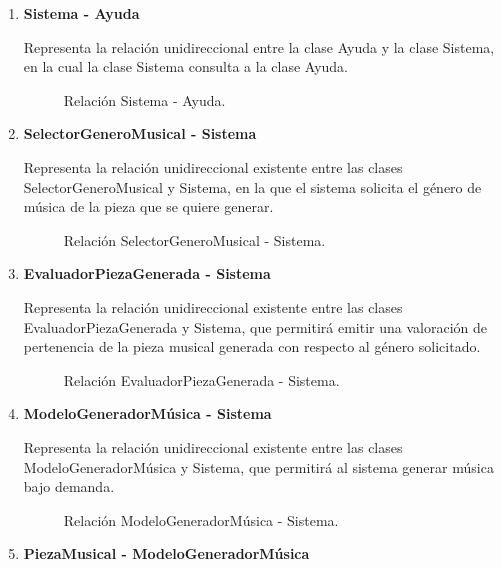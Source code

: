 \begin{enumerate}
  \item \textbf{Sistema - Ayuda}

  Representa la relación unidireccional entre la clase Ayuda y la
  clase Sistema, en la cual la clase Sistema consulta a la clase
  Ayuda.

  \begin{figure}[H]
    \centering
    
    \caption{Relación Sistema - Ayuda.}
  \end{figure}

  \item \textbf{SelectorGeneroMusical - Sistema}

  Representa la relación unidireccional existente entre las clases SelectorGeneroMusical y Sistema, en la que el sistema solicita el género de música de la pieza que se quiere generar.

  \begin{figure}[H]
    \centering
    
    \caption{Relación SelectorGeneroMusical - Sistema.}
  \end{figure}

  \item \textbf{EvaluadorPiezaGenerada - Sistema}

  Representa la relación unidireccional existente entre las clases EvaluadorPiezaGenerada y Sistema, que permitirá emitir una valoración de pertenencia de la pieza musical generada con respecto al género solicitado.

  \begin{figure}[H]
    \centering
    
    \caption{Relación EvaluadorPiezaGenerada - Sistema.}
  \end{figure}

  \item \textbf{ModeloGeneradorMúsica - Sistema}

  Representa la relación unidireccional existente entre las clases ModeloGeneradorMúsica y Sistema, que permitirá al sistema generar música bajo demanda.

  \begin{figure}[H]
    \centering
    
    \caption{Relación ModeloGeneradorMúsica - Sistema.}
  \end{figure}

  \item \textbf{PiezaMusical - ModeloGeneradorMúsica}


\end{enumerate}

